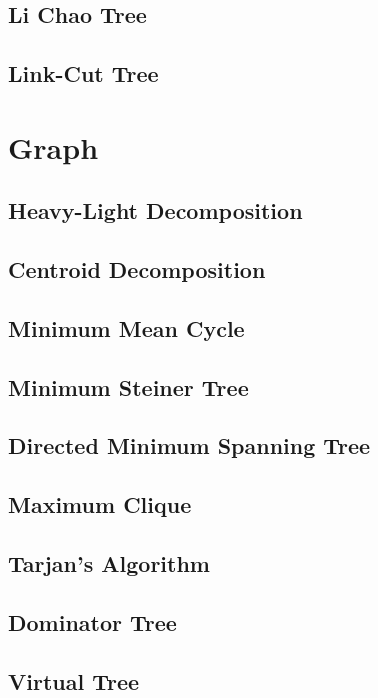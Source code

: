 \documentclass[a4paper,10pt,twocolumn,oneside]{article}
\begin{document}
\subsection{Li Chao Tree}

\subsection{Link-Cut Tree}

\section{Graph}
\subsection{Heavy-Light Decomposition}

\subsection{Centroid Decomposition}

\subsection{Minimum Mean Cycle}

\subsection{Minimum Steiner Tree}

\subsection{Directed Minimum Spanning Tree}

\subsection{Maximum Clique}

\subsection{Tarjan's Algorithm}

\subsection{Dominator Tree}

\subsection{Virtual Tree}

\end{document}
